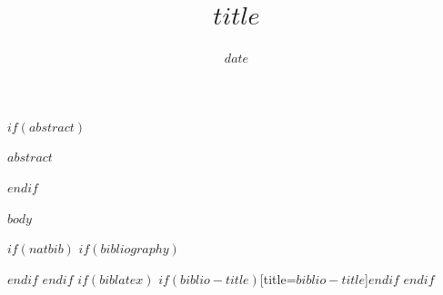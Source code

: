 \documentclass[sidenotes]{isrl-report}
\title{$title$}
\date{$date$}
\begin{document}
\maketitle

$if(abstract)$
\begin{abstractpage}
$abstract$
\end{abstractpage}
$endif$

$body$

$if(natbib)$
$if(bibliography)$

$endif$
$endif$
$if(biblatex)$
\printbibliography$if(biblio-title)$[title=$biblio-title$]$endif$
$endif$
\end{document}

